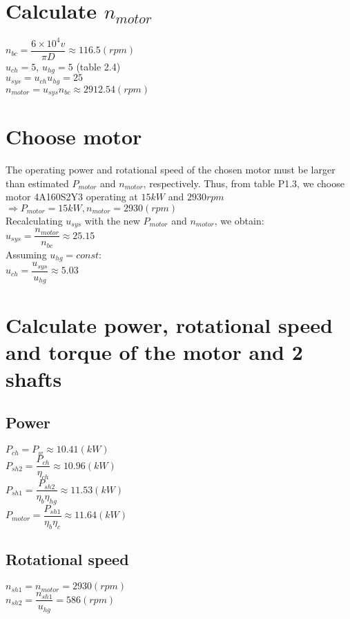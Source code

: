 \section{Calculate $ n_{motor} $}
$ n_{bc} = \dfrac{6\times10^4v}{\pi D} \approx 116.5 \unit{(rpm)}$\\
$ u_{ch} = 5$, $ u_{hg} = 5$ (table 2.4)\\
$ u_{sys} = u_{ch}u_{hg} = 25 $\\
$ n_{motor} = u_{sys}n_{bc} \approx 2912.54  \unit{(rpm)} $
\section{Choose motor}
The operating power and rotational speed of the chosen motor must be larger than estimated $ P_{motor} $ and $ n_{motor} $, respectively. Thus, from table P1.3, we choose motor 4A160S2Y3 operating at $ 15\unit{kW} $ and $ 2930\unit{rpm} $\\
$\Rightarrow P_{motor} = 15\unit{kW}, n_{motor} = 2930\unit{(rpm)}$\\
Recalculating $ u_{sys} $ with the new $ P_{motor} $ and $ n_{motor} $, we obtain:\\
$ u_{sys} = \dfrac{n_{motor}}{n_{bc}} \approx 25.15	$\\
Assuming $ u_{hg} = const $:\\
$ u_{ch} = \dfrac{u_{sys}}{u_{hg}} \approx 5.03$
\section{Calculate power, rotational speed and torque of the motor and 2 shafts}
\subsection{Power}
$ P_{ch} = P_w \approx 10.41\unit{(kW)}$\\
$ P_{sh2} = \dfrac{P_{ch}}{\eta_{ch}} \approx 10.96\unit{(kW)}$\\
$ P_{sh1} = \dfrac{P_{sh2}}{\eta_b\eta_{hg}} \approx 11.53\unit{(kW)}$\\
$ P_{motor} = \dfrac{P_{sh1}}{\eta_b\eta_c} \approx 11.64\unit{(kW)}$
\subsection{Rotational speed}
$ n_{sh1} = n_{motor} = 2930\unit{(rpm)}$\\
$ n_{sh2} = \dfrac{n_{sh1}}{u_{hg}} = 586 \unit{(rpm)}$
